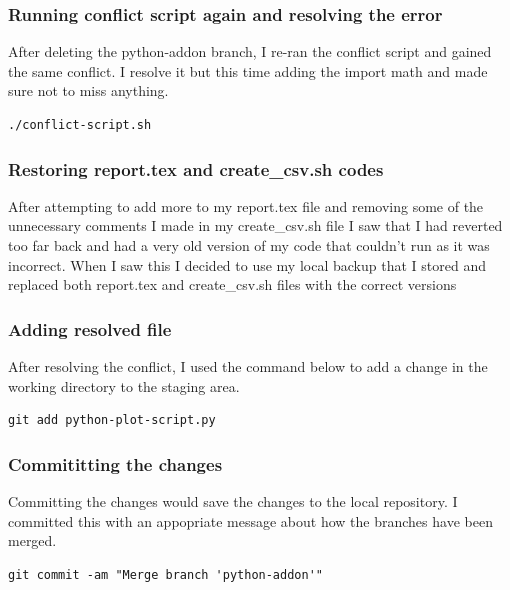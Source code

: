 \documentclass[]{article}
\begin{document}
\subsubsection{Running conflict script again and resolving the error}
After deleting the python-addon branch, I re-ran the conflict script and gained the same conflict.
I resolve it but this time adding the import math and made sure not to miss anything.
\begin{tcolorbox}[colback=white, colframe=black, boxrule=1pt, 
    fonttitle=\bfseries, listing only, listing options={language=sh, basicstyle=\ttfamily}]
\begin{verbatim}
./conflict-script.sh
\end{verbatim}
\end{tcolorbox}

\subsubsection{Restoring report.tex and create\_csv.sh codes}
After attempting to add more to my report.tex file and removing some of the unnecessary comments I made in
my create\_csv.sh file I saw that I had reverted too far back and had a very old version of my code that
couldn't run as it was incorrect. When I saw this I decided to use my local backup that I stored and replaced both
report.tex and create\_csv.sh files with the correct versions

\subsubsection{Adding resolved file}
After resolving the conflict, I used the command below to add a change in the working directory to the staging area.
\begin{tcolorbox}[colback=white, colframe=black, boxrule=1pt,
    fonttitle=\bfseries, listing only, listing options={language=sh, basicstyle=\ttfamily}]
\begin{verbatim}
git add python-plot-script.py
\end{verbatim}
\end{tcolorbox}

\clearpage

\subsubsection{Commititting the changes}
Committing the changes would save the changes to the local repository. I committed this with an appopriate message about how the
branches have been merged.
\begin{tcolorbox}[colback=white, colframe=black, boxrule=1pt, 
    fonttitle=\bfseries, listing only, listing options={language=sh, basicstyle=\ttfamily}]
\begin{verbatim}
git commit -am "Merge branch 'python-addon'"
\end{verbatim}
\end{tcolorbox}
\end{document}
